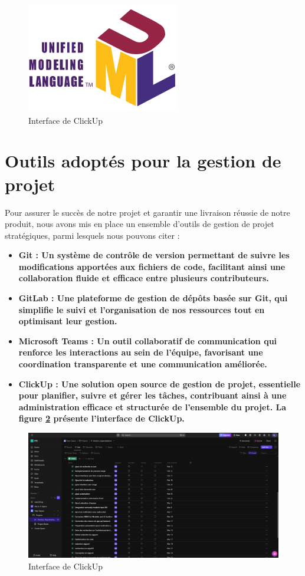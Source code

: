 {\begin{figure}[H]
\centering\includegraphics[scale=0.5]{images/UML_logo.png}
\caption{Interface de ClickUp}
\label{umlLogo}
\end{figure}
\section{Outils adoptés pour la gestion de projet}
\normalsize{
Pour assurer le succès de notre projet et garantir une livraison réussie de notre produit, nous avons mis en place un ensemble d'outils de gestion de projet stratégiques, parmi lesquels nous pouvons citer :
\begin{itemize}
    \item \noindent \bfseries Git \mdseries : Un système de contrôle de version permettant de suivre les modifications apportées aux fichiers de code, facilitant ainsi une collaboration fluide et efficace entre plusieurs contributeurs.
    \item \noindent \bfseries GitLab \mdseries : Une plateforme de gestion de dépôts basée sur Git, qui simplifie le suivi et l’organisation de nos ressources tout en optimisant leur gestion.
    \item \noindent \bfseries Microsoft Teams \mdseries : Un outil collaboratif de communication qui renforce les interactions au sein de l’équipe, favorisant une coordination transparente et une communication améliorée.
    \newpage
    \item \noindent \bfseries ClickUp \mdseries : Une solution open source de gestion de projet, essentielle pour planifier, suivre et gérer les tâches, contribuant ainsi à une administration efficace et structurée de l’ensemble du projet. La figure \ref{clickup} présente l'interface de ClickUp.
\end{itemize}

\begin{figure}[H]
\centering\includegraphics[scale=0.32]{images/clickUp.png}
\caption{Interface de ClickUp}
\label{clickup}
\end{figure}

}}
